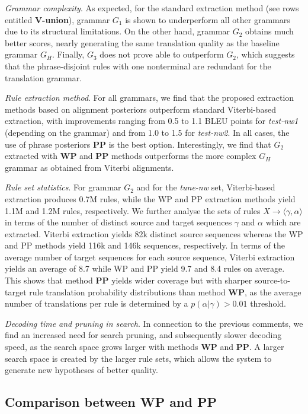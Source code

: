 {\em Grammar complexity}. As expected, for the standard extraction method (see
rows entitled {\bf V-union}), grammar $G_1$ is shown to underperform all other
grammars due to its structural limitations. On the other hand, grammar $G_2$
obtains much better scores, nearly generating the same translation quality as
the baseline grammar $G_H$. Finally, $G_3$ does not prove able to outperform
$G_2$, which suggests that the phrase-disjoint rules with one nonterminal are
redundant for the translation grammar.
    
{\em Rule extraction method}. For all grammars, we find that the proposed
extraction methods based on alignment posteriors outperform standard
Viterbi-based extraction, with improvements ranging from 0.5 to 1.1 BLEU points
for {\em test-nw1} (depending on the grammar) and from 1.0 to 1.5 for
{\em test-nw2}. In all cases, the use of phrase posteriors {\bf PP} is the best
option. Interestingly, we find that $G_2$ extracted with {\bf WP} and {\bf PP}
methods outperforms the more complex $G_H$ grammar as obtained from Viterbi
alignments.
    
{\em Rule set statistics}. For grammar $G_2$ and for the {\em tune-nw} set,
Viterbi-based extraction produces 0.7M rules, while the WP and PP extraction
methods yield 1.1M and 1.2M rules, respectively. We further analyse the sets of
rules $X \rightarrow \langle \gamma,\alpha \rangle$ in terms of the number of
distinct source and target sequences $\gamma$ and $\alpha$ which are extracted.
Viterbi extraction yields 82k distinct source sequences whereas the WP and PP
methods yield 116k and 146k sequences, respectively. In terms of the average
number of target sequences for each source sequence, Viterbi extraction yields
an average of 8.7 while WP and PP yield 9.7 and 8.4 rules on average. This shows
that method {\bf PP} yields wider coverage but with sharper source-to-target
rule translation probability distributions than method {\bf WP}, as the average
number of translations per rule is determined by a $p(\alpha|\gamma)>0.01$
threshold.

{\em Decoding time and pruning in search}. In connection to the previous
comments, we find an increased need for search pruning, and subsequently slower
decoding speed, as the search space grows larger with methods {\bf WP} and
{\bf PP}. A larger search space is created by the larger rule sets, which allows
the system to generate new hypotheses of better quality.

\subsection{Comparison between {\bf WP} and {\bf PP}}
\label{sec:extractionFromPosteriorsComparisonWPPP}

